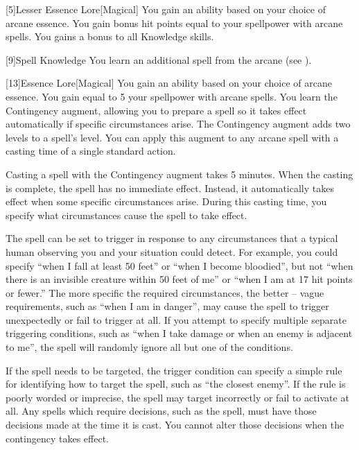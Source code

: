        [5]{Lesser Essence Lore}[Magical]
        You gain an ability based on your choice of arcane essence.
         You gain bonus hit points equal to your spellpower with arcane spells.
         You gains a  bonus to all Knowledge skills.

        [9]{Spell Knowledge}
        You learn an additional spell from the arcane  (see ).

        [13]{Essence Lore}[Magical]
        You gain an ability based on your choice of arcane essence.
         You gain  equal to 5 \add your spellpower with arcane spells.
         You learn the Contingency augment, allowing you to prepare a spell so it takes effect automatically if specific circumstances arise.
        The Contingency augment adds two levels to a spell's level.
        You can apply this augment to any arcane spell with a casting time of a single standard action.

        Casting a spell with the Contingency augment takes 5 minutes.
        When the casting is complete, the spell has no immediate effect.
        Instead, it automatically takes effect when some specific circumstances arise.
        During this casting time, you specify what circumstances cause the spell to take effect.

        The spell can be set to trigger in response to any circumstances that a typical human observing you and your situation could detect.
        For example, you could specify ``when I fall at least 50 feet'' or ``when I become bloodied'', but not ``when there is an invisible creature within 50 feet of me'' or ``when I am at 17 hit points or fewer.''
        The more specific the required circumstances, the better -- vague requirements, such as ``when I am in danger'', may cause the spell to trigger unexpectedly or fail to trigger at all.
        If you attempt to specify multiple separate triggering conditions, such as ``when I take damage or when an enemy is adjacent to me'', the spell will randomly ignore all but one of the conditions.

        If the spell needs to be targeted, the trigger condition can specify a simple rule for identifying how to target the spell, such as ``the closest enemy''.
        If the rule is poorly worded or imprecise, the spell may target incorrectly or fail to activate at all.
        Any spells which require decisions, such as the  spell, must have those decisions made at the time it is cast.
        You cannot alter those decisions when the contingency takes effect.

